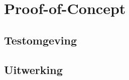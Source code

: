 
\chapter{Proof-of-Concept}%
\label{ch:poc}


\lipsum[76-80]

\section{Testomgeving}

\lipsum[76-80]

\section{Uitwerking}

\lipsum[76-80]